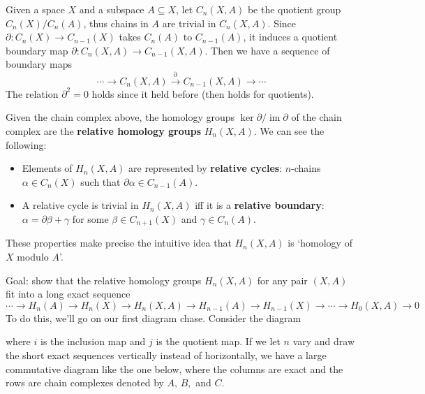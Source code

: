 Given a space $X$ and a subspace $A\subseteq X$, let $C_n (X,A)$ be the quotient group $C_n (X) / C_n (A)$, thus chains in $A$ are trivial in $C_n (X,A)$. Since $\partial \colon C_n (X)  \to C_{n-1}(X)$ takes $C_n (A)$ to $C_{n-1}(A)$, it induces a quotient boundary map $\partial \colon C_n (X,A) \to C_{n-1}(X,A)$. Then we have a sequence of boundary maps \[
    \cdots \to C_n (X,A) \overset{\partial }{\longrightarrow}C_{n-1} (X,A)\to \cdots 
\] The relation $\partial ^2=0$ holds since it held before (then holds for quotients).
\begin{definition}
    Given the chain complex above, the homology groups $\ker \partial  / \operatorname{im}\partial $ of the chain complex are the \textbf{relative homology groups} $H_n (X,A)$. We can see the following:
    \begin{itemize}
        \item Elements of $H_n (X,A)$ are represented by \textbf{relative cycles}: $n$-chains $\alpha \in C_n (X)$ such that $\partial \alpha \in C_{n-1}(A)$.
        \item A relative cycle is trivial in $H_n (X,A)$ iff it is a \textbf{relative boundary}: $\alpha =\partial \beta +\gamma$ for some $\beta \in C_{n+1}(X)$ and $\gamma\in C_n (A)$.
    \end{itemize}
    These properties make precise the intuitive idea that $H_n (X,A)$ is `homology of $X$ modulo $A$'.
\end{definition}
Goal: show that the relative homology groups $H_n (X,A)$ for any pair $(X,A)$ fit into a long exact sequence \[
    \cdots \to H_n (A)\to H_n (X)\to H_n (X,A)\to H_{n-1}(A) \to H_{n-1}(X)\to \cdots \to H_0(X,A)\to 0
\] 
To do this, we'll go on our first diagram chase. Consider the diagram
\begin{figure}[H]
\centering
{}
\end{figure} where $i$ is the inclusion map and $j$ is the quotient map. If we let $n$ vary and draw the short exact sequences vertically instead of horizontally, we have a large commutative diagram like the one below, where the columns are exact and the rows are chain complexes denoted by $A$, $B,$ and $C$.
